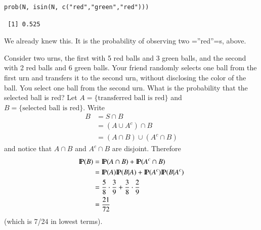 \documentclass[captions=tableheading]{scrbook}
\begin{document}
\begin{verbatim}
prob(N, isin(N, c("red","green","red")))
\end{verbatim}

\begin{verbatim}
 [1] 0.525
\end{verbatim}

We already knew this. It is the probability of observing two =''red''=s, above.


\begin{example}
Consider two urns, the first with 5 red balls and 3 green balls, and the second with 2 red balls and 6 green balls. Your friend randomly selects one ball from the first urn and transfers it to the second urn, without disclosing the color of the ball. You select one ball from the second urn. What is the probability that the selected ball is red? Let \( A = \{ \mbox{transferred ball is red} \} \) and \( B = \{ \mbox{selected ball is red} \} \). Write
\begin{align*}
B & =S\cap B\\
 & =(A\cup A^{c})\cap B\\
 & =(A\cap B)\cup(A^{c}\cap B)
\end{align*}
and notice that \(A\cap B\) and \(A^{c}\cap B\) are disjoint. Therefore
\begin{align*}
\P(B) & =\P(A\cap B)+\P(A^{c}\cap B)\\
 & =\P(A)\P(B|A)+\P(A^{c})\P(B|A^{c})\\
 & =\frac{5}{8}\cdot\frac{3}{9}+\frac{3}{8}\cdot\frac{2}{9}\\
 & =\frac{21}{72}\ 
\end{align*}
(which is 7/24 in lowest terms).

\end{example}
\end{document}
